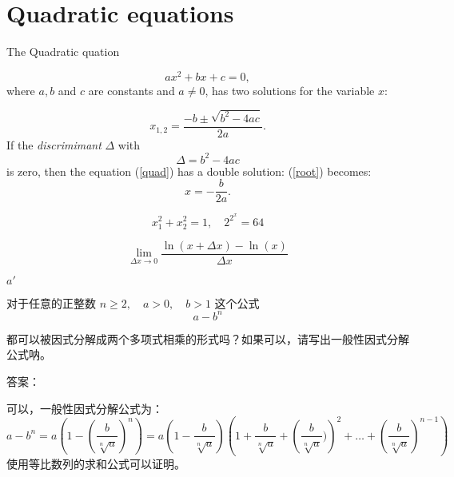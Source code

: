 \documentclass{article}
\begin{document}
\section{Quadratic equations}
The Quadratic quation

\begin{equation}
\label{quad}
ax^{2} + bx + c = 0,
\end{equation}
where \( a, b\) and \( c \) are constants and \( a \neq 0 \),
has two solutions for the variable \( x\):

\begin{equation}
\label{root}
x_{1, 2} = \frac{-b \pm \sqrt{b^2 - 4ac}}{2a}.
\end{equation}
If the \emph{discrimimant} \( \Delta \) with
\[
\Delta = b^2 - 4ac
\]
is zero, then the equation (\ref{quad}) has a double solution: (\ref{root})
becomes:
\[
x = - \frac{b}{2a}.
\]

\[ x_{1}^{2} + x_{2}^{2} = 1, \quad 2^{2^{x}} = 64
\]

\[ \lim_{\Delta x\rightarrow 0} \frac{\ln (x + \Delta x) - \ln(x)}{\Delta x}\]

$a\prime{}$


对于任意的正整数 \(n \geq 2, \quad a > 0, \quad b > 1\) 这个公式
\[
a - b^{n}
\]

都可以被因式分解成两个多项式相乘的形式吗？如果可以，请写出一般性因式分解公式呐。

答案：

可以，一般性因式分解公式为：
\[
a - b^n = a\left(1 - \left(\frac{b}{\sqrt[n]{a}}\right)^{n}\right) = 
a\left(1 - \frac{b}{\sqrt[n]{a}}\right)
\left(1 + \frac{b}{\sqrt[n]{a}} + \left(\frac{b}{\sqrt[n]{a}})\right)^2 + \ldots + 
\left(\frac{b}{\sqrt[n]{a}}\right)^{n-1}\right)
\]
使用等比数列的求和公式可以证明。
\end{document}
